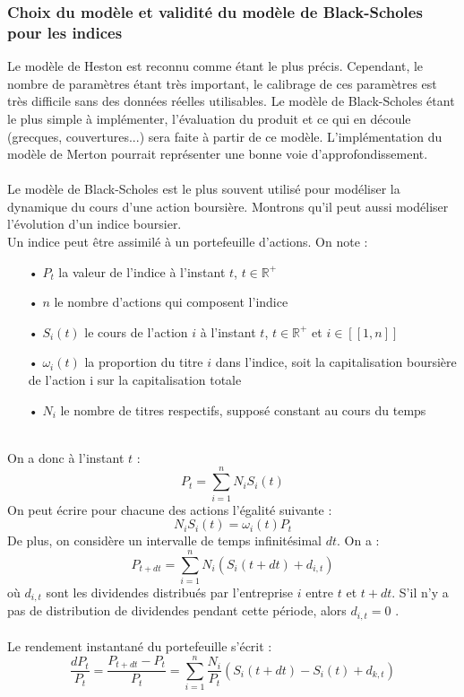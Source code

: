 \documentclass[french,12pt,a4paper]{article}
\begin{document}
\subsubsection{Choix du modèle et validité du modèle de Black-Scholes pour les indices}
Le modèle de Heston est reconnu comme étant le plus précis. Cependant, le nombre de paramètres étant très important, le calibrage de ces paramètres est très difficile sans des données réelles utilisables. Le modèle de Black-Scholes étant le plus simple à implémenter, l'évaluation du produit et ce qui en découle (grecques, couvertures...) sera faite à partir de ce modèle. L'implémentation du modèle de Merton pourrait représenter une bonne voie d'approfondissement. \\ \\
Le modèle de Black-Scholes est le plus souvent utilisé pour modéliser la dynamique du cours d'une action boursière. Montrons qu'il peut aussi modéliser l'évolution d'un indice boursier. \\
Un indice peut être assimilé à un portefeuille d'actions. On note :
\begin{itemize}
\item[•] $P_t$ la valeur de l'indice à l'instant $t$, $t \in \mathbb{R}^{+} $
\item[•] $n$ le nombre d'actions qui composent l'indice
\item[•] $S_{i}(t)$ le cours de l'action $i$ à l'instant $t$, $t \in \mathbb{R}^{+} $ et $i \in [[1,n]] $
\item[•] $ \omega_i (t) $ la proportion du titre $i$ dans l'indice, soit la capitalisation boursière de l'action i sur la capitalisation totale
\item[•] $N_i $ le nombre de titres respectifs, supposé constant au cours du temps\\
\end{itemize}
\\
On a donc à l'instant $t$ :
$$P_t = \sum_{i=1}^{n}N_{i}S_{i}(t) $$
On peut écrire pour chacune des actions l'égalité suivante :
$$ N_{i}S_{i}(t) = \omega_i(t)P_t $$
De plus, on considère un intervalle de temps infinitésimal $dt$. On a :
$$ P_{t+dt} = \sum_{i=1}^{n}N_i(S_i(t+dt) + d_{i,t}) $$
où $d_{i,t}$ sont les dividendes distribués par l'entreprise $i$ entre $t$ et $t+dt$. S'il n'y a pas de distribution de dividendes pendant cette période, alors $d_{i,t}=0$ .
\\
\\
Le rendement instantané du portefeuille s'écrit :
$$ \frac{dP_t}{P_t} = \frac{P_{t+dt}-P_t}{P_t} = \sum_{i=1}^n\frac{N_i}{P_t}(S_i(t+dt)-S_i(t) + d_{k,t}) $$
\end{document}
